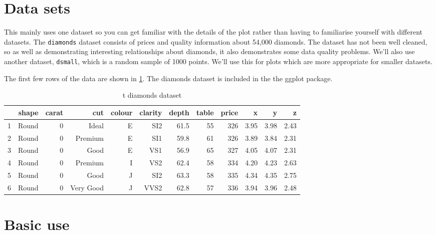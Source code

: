 \section{Data sets}\label{sec:data_sets}

This mainly uses one dataset so you can get familiar with the details of the plot rather than having to familiarise yourself with different datasets.  The {\tt diamonds} dataset consists of prices and quality information about 54,000 diamonds.  The dataset has not been well cleaned, so as well as demonstrating interesting relationships about diamonds, it also demonstrates some data quality problems.  We'll also use another dataset, {\tt dsmall}, which is a random sample of 1000 points.  We'll use this for plots which are more appropriate for smaller datasets.

The first few rows of the data are shown in \ref{tab:diamonds}.  The diamonds dataset is included in the the ggplot package.

\begin{table}[ht]
\begin{center}
\begin{tabular}{l|rrrrrrrrrrr}
\hline
 & shape & carat & cut & colour & clarity & depth & table & price & x & y & z \\
\hline
1 & Round & 0 & Ideal & E & SI2 & 61.5 & 55 & 326 & 3.95 & 3.98 & 2.43 \\
2 & Round & 0 & Premium & E & SI1 & 59.8 & 61 & 326 & 3.89 & 3.84 & 2.31 \\
3 & Round & 0 & Good & E & VS1 & 56.9 & 65 & 327 & 4.05 & 4.07 & 2.31 \\
4 & Round & 0 & Premium & I & VS2 & 62.4 & 58 & 334 & 4.20 & 4.23 & 2.63 \\
5 & Round & 0 & Good & J & SI2 & 63.3 & 58 & 335 & 4.34 & 4.35 & 2.75 \\
6 & Round & 0 & Very Good & J & VVS2 & 62.8 & 57 & 336 & 3.94 & 3.96 & 2.48 \\
\hline
\end{tabular}
\caption{{	t diamonds} dataset}
\label{tab:diamonds}
\end{center}
\end{table}

\section{Basic use}\label{sec:basic_use}

